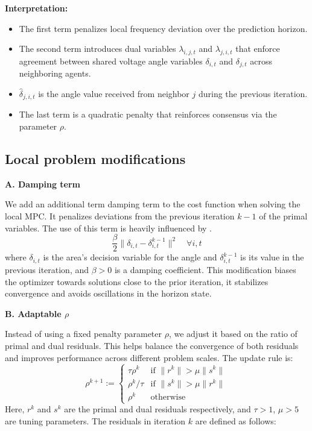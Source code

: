\documentclass{article}
\begin{document}
\textbf{Interpretation:}
\begin{itemize}
    \item The first term penalizes local frequency deviation over the prediction horizon.
    \item The second term introduces dual variables $\lambda_{i,j,t}$ and $\lambda_{j,i,t}$ that enforce agreement between shared voltage angle variables $\delta_{i,t}$ and $\delta_{j,t}$ across neighboring agents.
    \item $\hat{\delta}_{j,i,t}$ is the angle value received from neighbor $j$ during the previous iteration.
    \item The last term is a quadratic penalty that reinforces consensus via the parameter $\rho$.
\end{itemize}

\subsection{Local problem modifications}

\textbf{A. Damping term} 

We add an additional term damping term to the cost function when solving the local MPC. It penalizes deviations from the previous iteration $k-1$ of the primal variables. The use of this term is heavily influenced by \cite{ADMM:edu}.
\begin{equation}
 \frac{\beta}{2} \|\delta_{i,t} - \delta_{i,t}^{k-1}\|^2 \quad \forall i,t
\end{equation}
where $\delta_{i,t}$ is the area's decision variable for the angle and  $\delta_{i,t}^{k-1}$ is its value in the previous iteration, and \( \beta > 0 \) is a damping coefficient. This modification biases the optimizer towards solutions close to the prior iteration, it stabilizes convergence and avoids oscillations in the horizon state.

\textbf{B. Adaptable \(\rho\)} 

Instead of using a fixed penalty parameter \( \rho \), we adjust it based on the ratio of primal and dual residuals. This helps balance the convergence of both residuals and improves performance across different problem scales\cite{ADMM:boyd}. The update rule is:
\begin{equation}
\rho^{k+1} := 
\begin{cases}
\tau \rho^k & \text{if } \|r^k\| > \mu \|s^k\| \\
\rho^k / \tau & \text{if } \|s^k\| > \mu \|r^k\| \\
\rho^k & \text{otherwise}
\end{cases}
\end{equation}
Here, \( r^k \) and \( s^k \) are the primal and dual residuals respectively, and \( \tau > 1 \), \( \mu > 5 \) are tuning parameters. The residuals in iteration $k$ are defined as follows:
\end{document}
